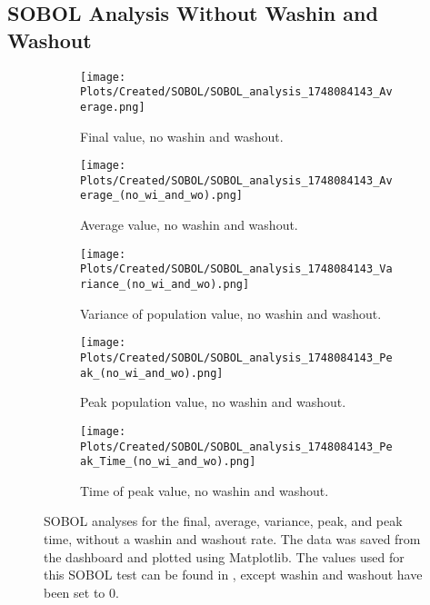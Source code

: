 \subsection{SOBOL Analysis Without Washin and Washout}
\begin{figure}[ht!]
    \centering
    \begin{subfigure}{0.32\linewidth}
        \centering
        \captionsetup{width=1\linewidth}
        \texttt{[image: Plots/Created/SOBOL/SOBOL\_analysis\_1748084143\_Average.png]}
        \caption{
            Final value, no washin and washout. 
        }
        \label{fig:created:SOBOL_final_no_wi_wo_extra}
    \end{subfigure}
    \hfill
    \begin{subfigure}{0.32\linewidth}
        \centering
        \captionsetup{width=1\linewidth}
        \texttt{[image: Plots/Created/SOBOL/SOBOL\_analysis\_1748084143\_Average\_(no\_wi\_and\_wo).png]}
        \caption{
            Average value, no washin and washout. 
        }
        \label{fig:created:SOBOL_average_no_wi_wo_extra}
    \end{subfigure}
    \hfill
    \begin{subfigure}{0.32\linewidth}
        \centering
        \captionsetup{width=1\linewidth}
        \texttt{[image: Plots/Created/SOBOL/SOBOL\_analysis\_1748084143\_Variance\_(no\_wi\_and\_wo).png]}
        \caption{
            Variance of population value, no washin and washout. 
        }
        \label{fig:created:SOBOL_variance_no_wi_wo_extra}
    \end{subfigure}
    \hfill
    \begin{subfigure}{0.32\linewidth}
        \centering
        \captionsetup{width=1\linewidth}
        \texttt{[image: Plots/Created/SOBOL/SOBOL\_analysis\_1748084143\_Peak\_(no\_wi\_and\_wo).png]}
        \caption{
            Peak population value, no washin and washout. 
        }
        \label{fig:created:SOBOL_peak_no_wi_wo_extra}
    \end{subfigure}
    \hfill
    \begin{subfigure}{0.32\linewidth}
        \centering
        \captionsetup{width=1\linewidth}
        \texttt{[image: Plots/Created/SOBOL/SOBOL\_analysis\_1748084143\_Peak\_Time\_(no\_wi\_and\_wo).png]}
        \caption{
            Time of peak value, no washin and washout. 
        }
        \label{fig:created:SOBOL_peak_time_no_wi_wo_extra}
    \end{subfigure}
    \caption{
        SOBOL analyses for the final, average, variance, peak, and peak time, without a washin and washout rate.
        The data was saved from the dashboard and plotted using Matplotlib. 
        The values used for this SOBOL test can be found in , except washin and washout have been set to 0. 
    }
    \label{fig:created:SOBOL_no_wi_wo_extra}
\end{figure}

